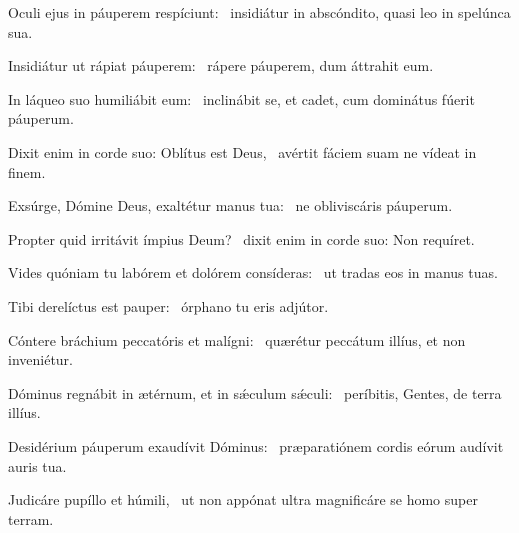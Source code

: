 \item Oculi ejus in páuperem respíciunt:~\psstar{} insidiátur in abscóndito, quasi leo in spelúnca sua.

\item Insidiátur ut rápiat páuperem:~\psstar{} rápere páuperem, dum áttrahit eum.

\item In láqueo suo humiliábit eum:~\psstar{} inclinábit se, et cadet, cum dominátus fúerit páuperum.

\item Dixit enim in corde suo: Oblítus est Deus,~\psstar{} avértit fáciem suam ne vídeat in finem.

\item Exsúrge, Dómine Deus, exaltétur manus tua:~\psstar{} ne obliviscáris páuperum.

\item Propter quid irritávit ímpius Deum?~\psstar{} dixit enim in corde suo: Non requíret.

\item Vides quóniam tu labórem et dolórem consíderas:~\psstar{} ut tradas eos in manus tuas.

\item Tibi derelíctus est pauper:~\psstar{} órphano tu eris adjútor.

\item Cóntere bráchium peccatóris et malígni:~\psstar{} quærétur peccátum illíus, et non inveniétur.

\item Dóminus regnábit in ætérnum, et in sǽculum sǽculi:~\psstar{} períbitis, Gentes, de terra illíus.

\item Desidérium páuperum exaudívit Dóminus:~\psstar{} præparatiónem cordis eórum audívit auris tua.

\item Judicáre pupíllo et húmili,~\psstar{} ut non appónat ultra magnificáre se homo super terram.